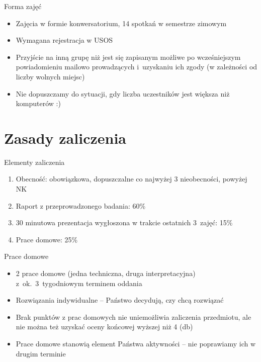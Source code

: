 \documentclass{beamer}
\begin{document}
\begin{frame}{Forma zajęć}
  \begin{itemize}
  \item Zajęcia w formie konwersatorium, 14 spotkań w semestrze zimowym
  \item Wymagana rejestracja w USOS
  \item Przyjście na inną grupę niż jest się zapisanym możliwe po wcześniejszym powiadomieniu mailowo prowadzących i~uzyskaniu ich zgody (w zależności od liczby wolnych miejsc)
  \item Nie dopuszczamy do sytuacji, gdy liczba uczestników jest większa niż komputerów :)
  \end{itemize}

\end{frame}

\section{Zasady zaliczenia}

\begin{frame}{Elementy zaliczenia}
  \begin{enumerate}
  \item Obecność: obowiązkowa, dopuszczalne co najwyżej 3 nieobecności, powyżej NK
  \item Raport z przeprowadzonego badania: 60\%
  \item 30 minutowa prezentacja wygłoszona w trakcie ostatnich 3~zajęć: 15\%
  \item Prace domowe: 25\%
  \end{enumerate}
\end{frame}

\begin{frame}{Prace domowe}
  \begin{itemize}
  \item 2 prace domowe (jedna techniczna, druga interpretacyjna) z~ok.~3~tygodniowym terminem oddania
  \item Rozwiązania indywidualne -- Państwo decydują, czy chcą rozwiązać
  \item Brak punktów z prac domowych nie uniemożliwia zaliczenia przedmiotu, ale nie można też uzyskać oceny końcowej wyższej niż 4 (db)
  \item Prace domowe stanowią element Państwa aktywności -- nie poprawiamy ich w drugim terminie
  \end{itemize}
\end{frame}
\end{document}
